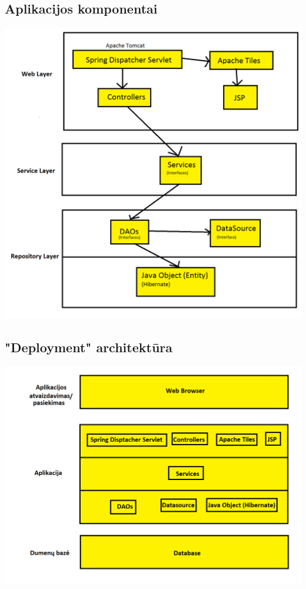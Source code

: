 \documentclass[a4paper,12pt]{article}
\begin{document}
\subsection{Aplikacijos komponentai}
\includegraphics[scale=0.5]{architektura4}
\subsection{"Deployment" architektūra}
\includegraphics[scale=0.5]{architektura3}
\end{document}

